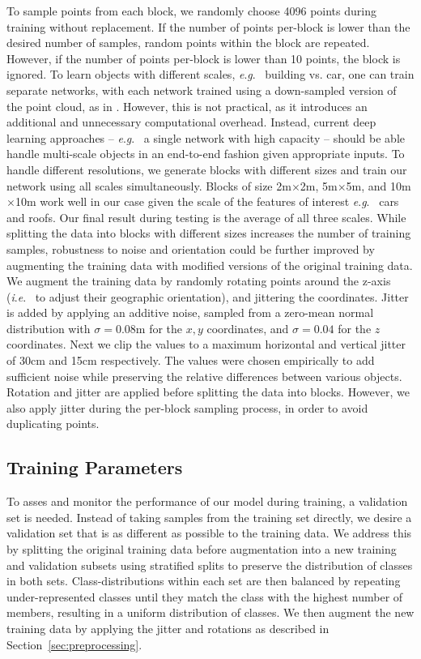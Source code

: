 \documentclass[final,3p,times,twocolumn,authoryear]{elsarticle}
\newcommand{\ie}{\textit{i}.\textit{e}.}
\newcommand{\eg}{\textit{e}.\textit{g}.}
\begin{document}
To sample points from each block, we randomly choose 4096 points during training without replacement.
If the number of points per-block is lower than the desired number of samples, random points within the block are repeated. 
However, if the number of points per-block is lower than 10 points, the block is ignored. 
To learn objects with different scales, \eg~ building vs. car, one can train separate networks, with each network trained using a down-sampled version of the point cloud, as in \citet{maturana2015voxnet}. 
However, this is not practical, as it introduces an additional and unnecessary computational overhead. 
Instead, current deep learning approaches -- \eg~ a single network with high capacity -- should be able handle multi-scale objects in an end-to-end fashion given appropriate inputs. 
To handle different resolutions, we generate blocks with different sizes and train our network using all scales simultaneously. %
Blocks of size 2m$\times$2m, 5m$\times$5m, and 10m$\times$10m work well in our case given the scale of the features of interest \eg~ cars and roofs. 
Our final result during testing is the average of all three scales.
While splitting the data into blocks with different sizes increases the number of training samples, robustness to noise and orientation could be further improved by augmenting the training data with modified versions of the original training data. 
We augment the training data by randomly rotating points around the z-axis (\ie~ to adjust their geographic orientation), and jittering the coordinates.  
Jitter is added by applying an additive noise, sampled from a zero-mean normal distribution with $\sigma=0.08$m for the $x,y$ coordinates, and $\sigma=0.04$ for the $z$ coordinates. 
Next we clip the values to a maximum horizontal and vertical jitter of 30cm and 15cm respectively. 
The values were chosen empirically to add sufficient noise while preserving the relative differences between various objects.
Rotation and jitter are applied before splitting the data into blocks. However, we also apply jitter during the per-block sampling process, in order to avoid duplicating points. %
\subsection{Training Parameters}
\label{sec:training_parameters}
To asses and monitor the performance of our model during training, a validation set is needed.
Instead of taking samples from the training set directly, we desire a validation set that is as different as possible to the training data.
We address this by splitting the original training data before augmentation into a new training and validation subsets using stratified splits to preserve the distribution of classes in both sets. 
Class-distributions within each set are then balanced by repeating under-represented classes until they match the class with the highest number of members, resulting in a uniform distribution of classes. 
We then augment the new training data by applying the jitter and rotations as described in Section~\ref{sec:preprocessing}. 
\end{document}
